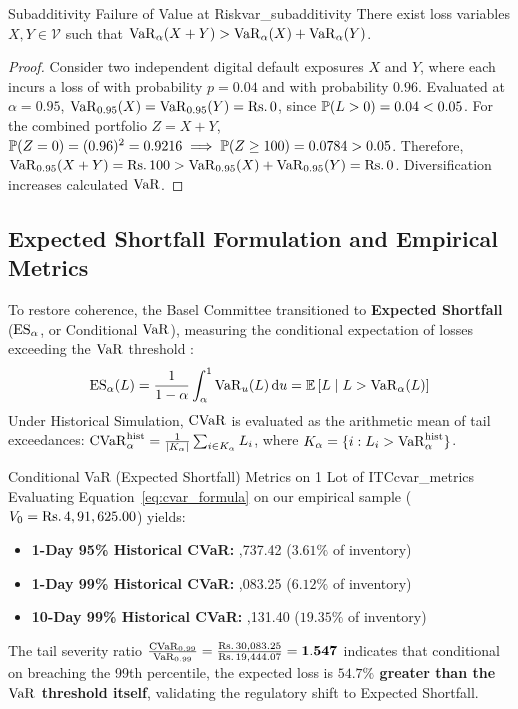 \begin{theorem}{Subadditivity Failure of Value at Risk}{var_subadditivity}
There exist loss variables $X, Y \in \mathcal{V}$ such that $\operatorname{VaR}_{\alpha}(X + Y) > \operatorname{VaR}_{\alpha}(X) + \operatorname{VaR}_{\alpha}(Y)$.
\end{theorem}
\begin{proof}
Consider two independent digital default exposures $X$ and $Y$, where each incurs a loss of  with probability $p = 0.04$ and  with probability $0.96$. Evaluated at $\alpha = 0.95$, $\operatorname{VaR}_{0.95}(X) = \operatorname{VaR}_{0.95}(Y) = \text{\text{Rs.}\,}0$, since $\mathbb{P}(L > 0) = 0.04 < 0.05$. For the combined portfolio $Z = X + Y$, $\mathbb{P}(Z = 0) = (0.96)^2 = 0.9216 \implies \mathbb{P}(Z \ge 100) = 0.0784 > 0.05$. Therefore, $\operatorname{VaR}_{0.95}(X + Y) = \text{\text{Rs.}\,}100 > \operatorname{VaR}_{0.95}(X) + \operatorname{VaR}_{0.95}(Y) = \text{\text{Rs.}\,}0$. Diversification increases calculated $\operatorname{VaR}$.
\end{proof}

\subsection{Expected Shortfall Formulation and Empirical Metrics}

To restore coherence, the Basel Committee transitioned to \textbf{Expected Shortfall} ($\operatorname{ES}_\alpha$, or Conditional $\operatorname{VaR}$), measuring the conditional expectation of losses exceeding the $\operatorname{VaR}$ threshold \citep{mcneil2015quantitative}:
\begin{equation}
    \operatorname{ES}_{\alpha}(L) = \frac{1}{1-\alpha} \int_{\alpha}^1 \operatorname{VaR}_{u}(L) \, \mathrm{d} u = \mathbb{E}\left[ L \;\middle|\; L > \operatorname{VaR}_{\alpha}(L) \right]
    \label{eq:cvar_formula}
\end{equation}
Under Historical Simulation, $\operatorname{CVaR}$ is evaluated as the arithmetic mean of tail exceedances: $\operatorname{CVaR}_{\alpha}^{\text{hist}} = \frac{1}{|K_\alpha|} \sum_{i \in K_\alpha} L_i$, where $K_\alpha = \{i : L_i > \operatorname{VaR}_\alpha^{\text{hist}}\}$.

\begin{empiricalbox}{Conditional VaR (Expected Shortfall) Metrics on 1 Lot of ITC}{cvar_metrics}
Evaluating Equation~\eqref{eq:cvar_formula} on our empirical sample ($V_0 = \text{\text{Rs.}\,}4,91,625.00$) yields:
\begin{itemize}[leftmargin=1.5em, itemsep=1pt, parsep=0pt]
    \item \textbf{1-Day 95\% Historical CVaR:} ,737.42 ($3.61\%$ of inventory)
    \item \textbf{1-Day 99\% Historical CVaR:} ,083.25 ($6.12\%$ of inventory)
    \item \textbf{10-Day 99\% Historical CVaR:} ,131.40 ($19.35\%$ of inventory)
\end{itemize}
\end{empiricalbox}

The tail severity ratio $\frac{\operatorname{CVaR}_{0.99}}{\operatorname{VaR}_{0.99}} = \frac{\text{\text{Rs.}\,}30,083.25}{\text{\text{Rs.}\,}19,444.07} = \mathbf{1.547}$ indicates that conditional on breaching the 99th percentile, the expected loss is \textbf{$54.7\%$ greater than the $\operatorname{VaR}$ threshold itself}, validating the regulatory shift to Expected Shortfall.

\clearpage
